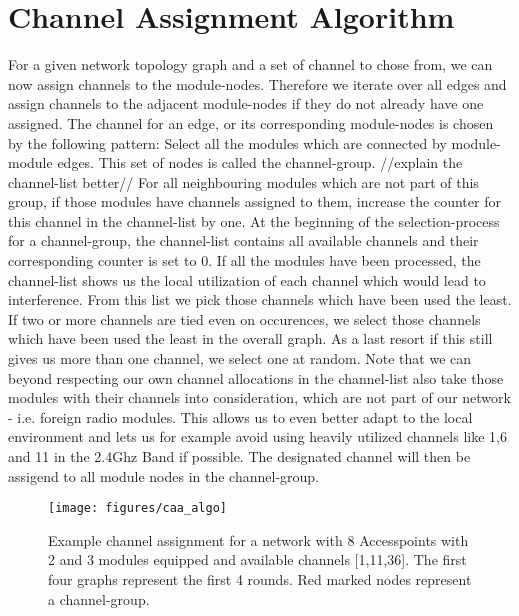 \section{Channel Assignment Algorithm}
  For a given network topology graph and a set of channel to chose from, we can now assign channels to the module-nodes. Therefore we iterate over all 
  edges and assign channels to the adjacent module-nodes if they do not already have one assigned. The channel for an edge, 
  or its corresponding module-nodes is chosen by the following pattern:
  Select all the modules which are connected by module-module edges. This set of nodes is called the channel-group. //explain the channel-list better//
  For all neighbouring modules which are not part of this group, if those modules have channels assigned to them, 
  increase the counter for this channel in the channel-list by one. At the beginning of the selection-process for a channel-group, the channel-list contains
  all available channels and their corresponding counter is set to 0.
  If all the modules have been processed, the channel-list shows us the local utilization of each channel which would lead to interference.
  From this list we pick those channels which have been used the least. If two or more channels are tied even on occurences, we select those channels which have
  been used the least in the overall graph. As a last resort if this still gives us more than one channel, we select one at random.
  Note that we can beyond respecting our own channel allocations in the channel-list also take those modules with their channels into consideration, 
  which are not part of our network - i.e. foreign radio modules. This allows us to even better adapt to the local environment and lets us for example
  avoid using heavily utilized channels like 1,6 and 11 in the 2.4Ghz Band if possible.
  The designated channel will then be assigend to all module nodes in the channel-group.
  \begin{figure}[htbp]
    \centering
    \texttt{[image: figures/caa\_algo]}
    \caption{Example channel assignment for a network with 8 Accesspoints with 2 and 3 modules equipped and available channels [1,11,36]. 
    The first four graphs represent the first 4 rounds. Red marked nodes represent a channel-group.}
    \label{fig:caa_algo}
  \end{figure}
